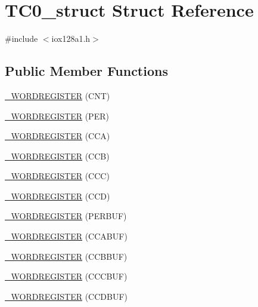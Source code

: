 \hypertarget{struct_t_c0__struct}{
\section{TC0\_\-struct Struct Reference}
\label{struct_t_c0__struct}
}


{\ttfamily \#include $<$iox128a1.h$>$}

\subsection*{Public Member Functions}
\begin{DoxyCompactItemize}
\item 
\hyperlink{struct_t_c0__struct_af7fcbdf56d92a360e29a8d36b8f97c73}{\_\-WORDREGISTER} (CNT)
\item 
\hyperlink{struct_t_c0__struct_add36c78fc3b8edd15bf4b5f8a4cdadf9}{\_\-WORDREGISTER} (PER)
\item 
\hyperlink{struct_t_c0__struct_a62a6a03d186bf5f51686aa879fa71c18}{\_\-WORDREGISTER} (CCA)
\item 
\hyperlink{struct_t_c0__struct_a6e6973dd4fbcf148fc5eee2fc42bc8e3}{\_\-WORDREGISTER} (CCB)
\item 
\hyperlink{struct_t_c0__struct_a6e70bb96cba0bff07ec799bf56ee59d7}{\_\-WORDREGISTER} (CCC)
\item 
\hyperlink{struct_t_c0__struct_a1e471d3541fbea967a5a2f7dcdd944dc}{\_\-WORDREGISTER} (CCD)
\item 
\hyperlink{struct_t_c0__struct_af35c694d01ee46e9d2a1c0fa47124656}{\_\-WORDREGISTER} (PERBUF)
\item 
\hyperlink{struct_t_c0__struct_a616c3cabab9c6e4cdc5616db202e2db3}{\_\-WORDREGISTER} (CCABUF)
\item 
\hyperlink{struct_t_c0__struct_aafcc7261f15a36a8145d5b5adbcb13ad}{\_\-WORDREGISTER} (CCBBUF)
\item 
\hyperlink{struct_t_c0__struct_aeb135271a057b6cfff5766de1351f195}{\_\-WORDREGISTER} (CCCBUF)
\item 
\hyperlink{struct_t_c0__struct_a8b28abe7630ac86b5ef2d8df190723ca}{\_\-WORDREGISTER} (CCDBUF)
\end{DoxyCompactItemize}
